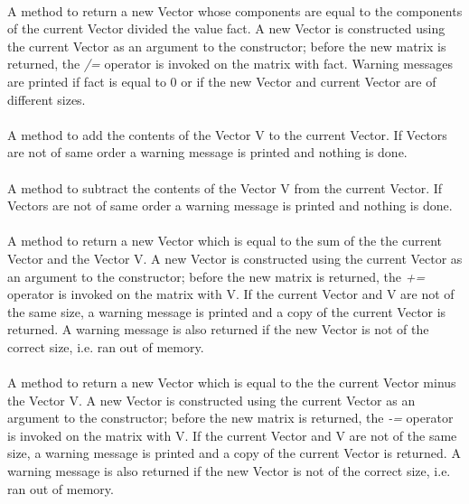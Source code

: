  \\
A method to return a new Vector whose components are equal to the
components of the current Vector divided the value \p fact. A new
Vector is constructed using the current Vector as an argument to the
constructor; before the new matrix is returned, the {\em /=} operator
is invoked on the matrix with \p fact. Warning messages are printed
if \p fact is equal to $0$ or if the new Vector and current Vector
are of different sizes. \\ 

 \\
A method to add the contents of the Vector \p V to the current
Vector. If Vectors are not of same order a warning message is printed
and nothing is done.  \\ 

 \\
A method to subtract the contents of the Vector \p V from the
current Vector. If Vectors are not of same order a warning message is
printed and nothing is done.  \\ 


 \\
A method to return a new Vector which is equal to the sum of the
the current Vector and the Vector \p V. A new Vector is constructed
using the current Vector as an argument to the constructor; before the
new matrix is returned, the {\em +=} operator is invoked on the matrix
with \p V. If the current Vector and \p V are not of the same size,
a warning message is printed and a copy of the current Vector is
returned. A warning message is also returned if the new Vector is not
of the correct size, i.e. ran out of memory. \\ 


 \\
A method to return a new Vector which is equal to the the current
Vector minus the Vector \p V. A new Vector is constructed using the
current Vector as an argument to the constructor; before the new
matrix is returned, the {\em -=} operator is invoked on the matrix
with \p V. If the current Vector and \p V are not of the same size,
a warning message is printed and a copy of the current Vector is
returned. A warning message is also returned if the new Vector is not
of the correct size, i.e. ran out of memory. \\ 


